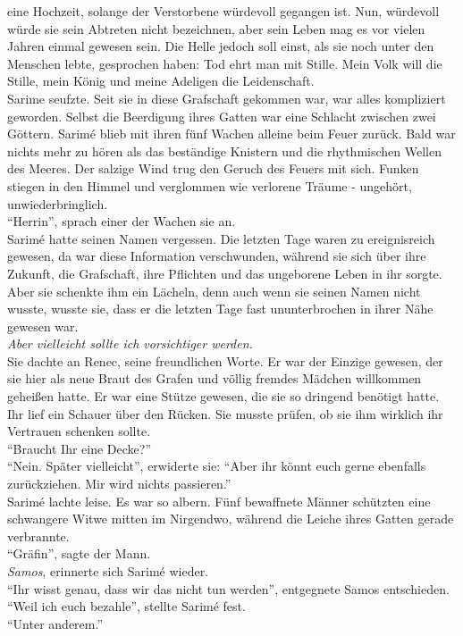 eine Hochzeit, solange der Verstorbene würdevoll gegangen ist. Nun, würdevoll würde sie sein 
Abtreten nicht bezeichnen, aber sein Leben mag es vor vielen Jahren einmal gewesen sein. Die Helle 
jedoch soll einst, als sie noch unter den Menschen lebte, gesprochen haben: Tod ehrt man mit Stille.
Mein Volk will die Stille, mein König und meine Adeligen die Leidenschaft.\\
Sarime seufzte. Seit sie in diese Grafschaft gekommen war, war alles kompliziert geworden. Selbst 
die Beerdigung ihres Gatten war eine Schlacht zwischen zwei Göttern. Sarimé blieb mit ihren fünf 
Wachen alleine beim Feuer zurück. Bald war nichts mehr zu hören als das beständige Knistern und die 
rhythmischen Wellen des Meeres. Der salzige Wind trug den Geruch des Feuers mit sich. Funken 
stiegen in den Himmel und verglommen wie verlorene Träume - ungehört, unwiederbringlich. \\
``Herrin'', sprach einer der Wachen sie an.\\
Sarimé hatte seinen Namen vergessen. Die letzten Tage waren zu ereignisreich gewesen, da war diese 
Information verschwunden, während sie sich über ihre Zukunft, die Grafschaft, ihre Pflichten und 
das ungeborene Leben in ihr sorgte. Aber sie schenkte ihm ein Lächeln, denn auch wenn sie seinen 
Namen nicht wusste, wusste sie, dass er die letzten Tage fast ununterbrochen in ihrer Nähe gewesen 
war. \\
\textit{ Aber vielleicht sollte ich vorsichtiger werden.}\\
Sie dachte an Renec, seine freundlichen Worte. Er war der Einzige gewesen, der sie hier als neue 
Braut des Grafen und völlig fremdes Mädchen willkommen geheißen hatte. Er war eine Stütze gewesen, 
die sie so dringend benötigt hatte. Ihr lief ein Schauer über den Rücken. Sie musste prüfen, ob sie 
ihm wirklich ihr Vertrauen schenken sollte.\\
``Braucht Ihr eine Decke?''\\
``Nein. Später vielleicht'', erwiderte sie: ``Aber ihr könnt euch gerne ebenfalls zurückziehen. Mir 
wird nichts passieren.'' \\ 
Sarimé lachte leise. Es war so albern. Fünf bewaffnete Männer schützten eine schwangere Witwe 
mitten im Nirgendwo, während die Leiche ihres Gatten gerade verbrannte.\\
``Gräfin'', sagte der Mann.\\
\textit{Samos}, erinnerte sich Sarimé wieder.\\
``Ihr wisst genau, dass wir das nicht tun werden'', entgegnete Samos entschieden.\\
``Weil ich euch bezahle'', stellte Sarimé fest.\\
``Unter anderem.''\\


